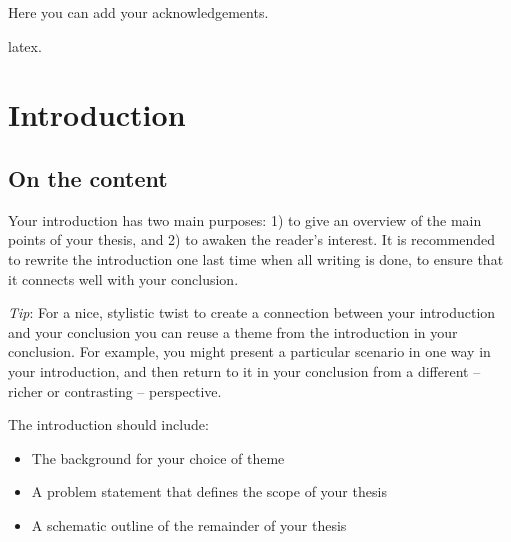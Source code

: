 \documentclass[a4paper,twoside]{bth}
\begin{document}
\acknowledgments %
\noindent
Here you can add your acknowledgements.

\cleardoublepage


\setcounter{secnumdepth}{3} %
\tableofcontents
\listoffigures             %

\cleardoublepage
\pagestyle{headings}
\printglossaries
\gls{latex}.



\chapter{Introduction}
\label{chp:introduction}  %
\section{On the content}
Your introduction has two main purposes: 1) to give an overview of the main points of your thesis, and 2) to awaken the reader's interest. It is recommended to rewrite the introduction one last time when all writing is done, to ensure that it connects well with your conclusion.

\emph{Tip}: For a nice, stylistic twist to create a connection between your introduction and your conclusion you can reuse a theme from the introduction in your conclusion. For example, you might present a particular scenario in one way in your introduction, and then return to it in your conclusion from a different -- richer or contrasting -- perspective.

The introduction should include:
\begin{itemize}
    \item The background for your choice of theme
    \item A problem statement that defines the scope of your thesis
    \item A schematic outline of the remainder of your thesis 
\end{itemize}
\end{document}
